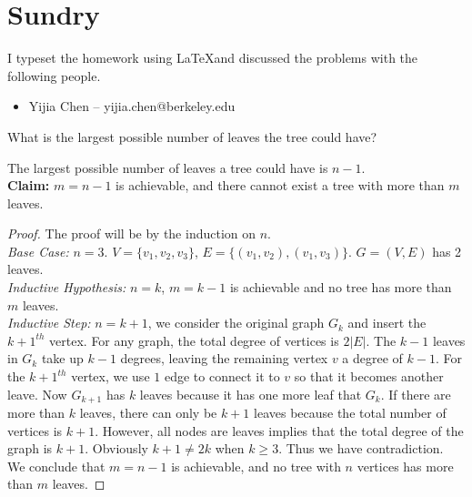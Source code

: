 \documentclass[11pt]{article}
\begin{document}
\section*{Sundry}

\begin{Answer}
    I typeset the homework using \LaTeX and discussed the problems with the following people. 
    \begin{itemize}
        \item Yijia Chen -- yijia.chen@berkeley.edu
    \end{itemize}
\end{Answer}

\newpage
{}

\begin{Parts}
    \Part What is the largest possible number of leaves the tree could have?
    \begin{Answer}
        The largest possible number of leaves a tree could have is $n-1$. \\
        \textbf{Claim:} $m=n-1$ is achievable, and there cannot exist a tree with more than $m$ leaves.
        \begin{proof}
            The proof will be by the induction on $n$. \\
            \emph{Base Case:} $n=3$. $V=\{v_1,v_2,v_3\}$, $E=\{(v_1,v_2),(v_1,v_3)\}$. $G=(V,E)$ has 2 leaves. \\
            \emph{Inductive Hypothesis:} $n=k$, $m=k-1$ is achievable and no tree has more than $m$ leaves. \\
            \emph{Inductive Step:} $n=k+1$, we consider the original graph $G_k$ and insert the $k+1^{th}$ vertex. 
                                   For any graph, the total degree of vertices is $2|E|$. The $k-1$ leaves in $G_k$
                                   take up $k-1$ degrees, leaving the remaining vertex $v$ a degree of $k-1$. For the
                                   $k+1^{th}$ vertex, we use $1$ edge to connect it to $v$ so that it becomes another 
                                   leave. Now $G_{k+1}$ has $k$ leaves because it has one more leaf that $G_k$. If there
                                   are more than $k$ leaves, there can only be $k+1$ leaves because the total number of 
                                   vertices is $k+1$. However, all nodes are leaves implies that the total degree of 
                                   the graph is $k+1$. Obviously $k+1 \neq 2k$ when $k \geq 3$. Thus we have contradiction.\\
            We conclude that $m=n-1$ is achievable, and no tree with $n$ vertices has more than $m$ leaves. 
        \end{proof}
    \end{Answer}


\end{Parts}
\end{document}
